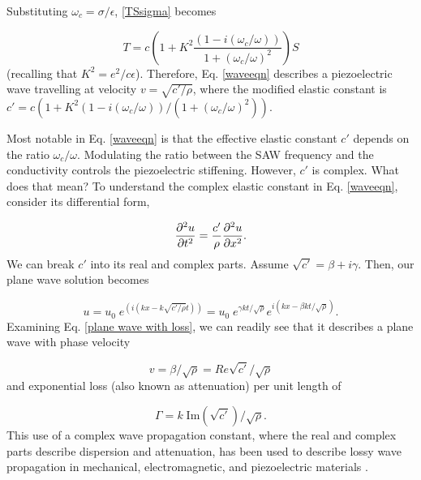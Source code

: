 \documentclass[double,12pt,1in]{beavtex}
\begin{document}
Substituting $\omega_c = \sigma/\epsilon$, \ref{TSsigma} becomes

\begin{equation}
    T = c(1 + K^2\frac{(1-i(\omega_c/\omega))}{1+(\omega_c/\omega)^2})S \label{waveeqn}
\end{equation}
(recalling that $K^2 = e^2/c\epsilon$). Therefore, Eq. \ref{waveeqn} describes a piezoelectric wave travelling at velocity $v = \sqrt{c'/\rho}$, where the modified elastic constant is $c' = c(1 + K^2(1-i(\omega_c/\omega))/(1+(\omega_c/\omega)^2))$.

Most notable in Eq. \ref{waveeqn} is that the effective elastic constant $c'$ depends on the ratio $\omega_c/\omega$. Modulating the ratio between the SAW frequency and the conductivity controls the piezoelectric stiffening. However, $c'$ is complex. What does that mean? To understand the complex elastic constant in Eq. \ref{waveeqn}, consider its differential form,

\begin{equation}
    \pdv[2]{u}{t} = \frac{c'}{\rho} \pdv[2]{u}{x}.
\end{equation}
We can break $c'$ into its real and complex parts. Assume $\sqrt{c'} = \beta + i\gamma$. Then, our plane wave solution becomes

\begin{equation}
    u = u_0 \; e^{(i(kx-k\sqrt{c'/\rho}t))}
    = u_0 \; e^{\gamma kt/\sqrt{\rho}}e^{i(kx - \beta kt/\sqrt{\rho})}. \label{plane wave with loss}
\end{equation}
Examining Eq. \ref{plane wave with loss}, we can readily see that it describes a plane wave with phase velocity 

\begin{equation}
    v = \beta/\sqrt{\rho} = Re{\sqrt{c'}}/\sqrt{\rho} \label{velocity from plane wave}
\end{equation} 
and exponential loss (also known as attenuation) per unit length of 

\begin{equation}
    \Gamma = k \; \mathrm{Im}(\sqrt{c'})/\sqrt{\rho}. \label{attenuation from plane wave}
\end{equation} 
This use of a complex wave propagation constant, where the real and complex parts describe dispersion and attenuation, has been used to describe lossy wave propagation in mechanical, electromagnetic, and piezoelectric materials \cite{holland_representation_1967} \cite[p. 18]{pozar_microwave_2012} \cite{weinreich_acoustodynamic_1956, gonzalez_revisiting_2016}. 
\end{document}

